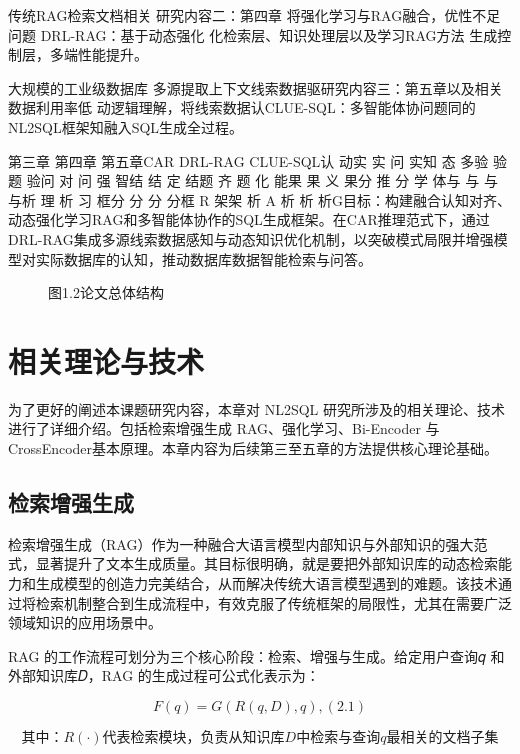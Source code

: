 \documentclass[12pt,a4paper,openright,UTF8]{ctexbook}
\begin{document}
传统RAG检索文档相关 研究内容二：第四章 将强化学习与RAG融合，优性不足问题 DRL-RAG：基于动态强化 化检索层、知识处理层以及学习RAG方法 生成控制层，多端性能提升。


大规模的工业级数据库 多源提取上下文线索数据驱研究内容三：第五章以及相关数据利用率低 动逻辑理解，将线索数据认CLUE-SQL：多智能体协问题同的NL2SQL框架知融入SQL生成全过程。


第三章 第四章 第五章CAR DRL-RAG CLUE-SQL认 动实 实 问 实知 态 多验 验 题 验问 对 问 强 智结 结 定 结题 齐 题 化 能果 果 义 果分 推 分 学 体与 与 与 与析 理 析 习 框分 分 分 分框 R 架架 析 A 析 析 析G目标：构建融合认知对齐、动态强化学习RAG和多智能体协作的SQL生成框架。在CAR推理范式下，通过DRL-RAG集成多源线索数据感知与动态知识优化机制，以突破模式局限并增强模型对实际数据库的认知，推动数据库数据智能检索与问答。

\begin{figure}[htbp]
\centering
{}
\caption{图1.2论文总体结构}
\end{figure}


\chapter{相关理论与技术}

为了更好的阐述本课题研究内容，本章对 NL2SQL 研究所涉及的相关理论、技术进行了详细介绍。包括检索增强生成 RAG、强化学习、Bi-Encoder 与 CrossEncoder基本原理。本章内容为后续第三至五章的方法提供核心理论基础。

\section{检索增强生成}

检索增强生成（RAG）作为一种融合大语言模型内部知识与外部知识的强大范式，显著提升了文本生成质量。其目标很明确，就是要把外部知识库的动态检索能力和生成模型的创造力完美结合，从而解决传统大语言模型遇到的难题。该技术通过将检索机制整合到生成流程中，有效克服了传统框架的局限性，尤其在需要广泛领域知识的应用场景中。


RAG 的工作流程可划分为三个核心阶段：检索、增强与生成。给定用户查询𝑞 和外部知识库𝐷，RAG 的生成过程可公式化表示为：

\begin{equation}
F(q) = G(R(q,D),q), (2.1)
\end{equation}


\begin{equation}
其中：R(\cdot) 代表检索模块，负责从知识库 D 中检索与查询 q 最相关的文档子集
\end{equation}
\end{document}
